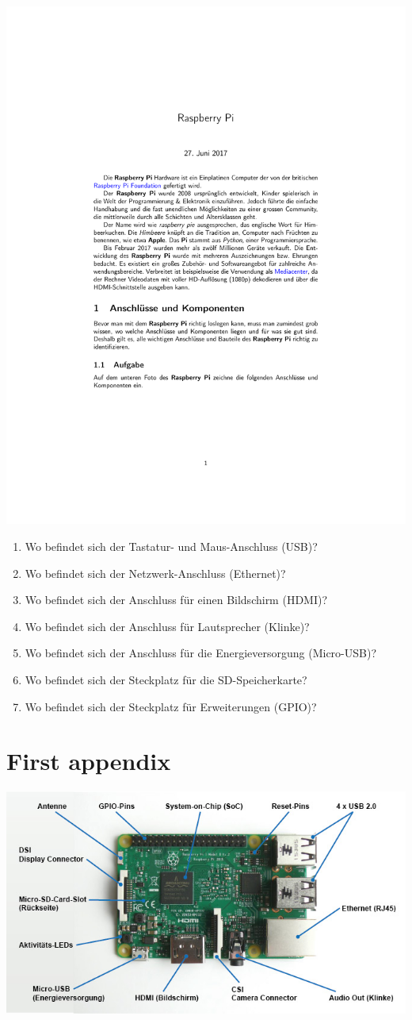 \documentclass[10pt]{article}
\begin{document}
\includegraphics[scale=1.1]{raspberry}

\begin{enumerate}
\item Wo befindet sich der Tastatur- und Maus-Anschluss (USB)?
\item Wo befindet sich der Netzwerk-Anschluss (Ethernet)?
\item Wo befindet sich der Anschluss für einen Bildschirm (HDMI)?
\item Wo befindet sich der Anschluss für Lautsprecher (Klinke)?
\item Wo befindet sich der Anschluss für die Energieversorgung (Micro-USB)?
\item Wo befindet sich der Steckplatz für die SD-Speicherkarte?
\item Wo befindet sich der Steckplatz für Erweiterungen (GPIO)?
\end{enumerate}

\appendix
\makeatletter
\def\@seccntformat#1{Appendix~\csname the#1\endcsname:\quad}
\makeatother

\section{First appendix}

\includegraphics[scale=0.5]{raspberry_loesung}
\end{document}
